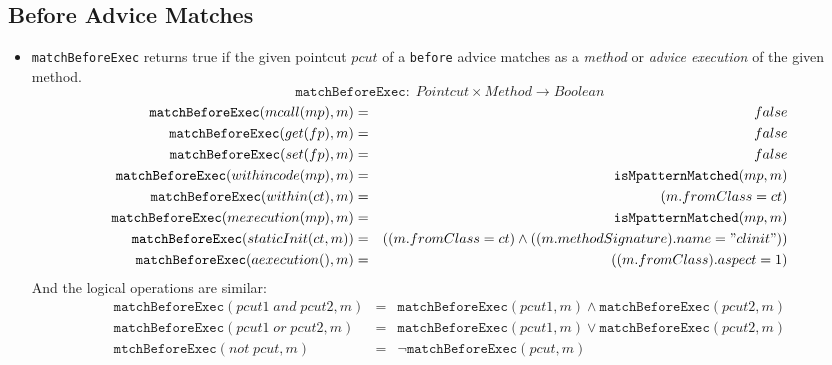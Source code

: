 \subsection{Before Advice Matches}
\begin{itemize}
  \item
  \texttt{matchBeforeExec} returns true if the given pointcut $pcut$ of a \texttt{before} advice matches as a \textsl{method} or \textsl{advice execution} of the given method.
$$\texttt{matchBeforeExec}:\;Pointcut\times Method\rightarrow Boolean$$
\begin{eqnarray*}
  \texttt{matchBeforeExec}(mcall(mp),m)&=&false\\
  \texttt{matchBeforeExec}(get(fp),m)&=&false\\
  \texttt{matchBeforeExec}(set(fp),m)&=&false\\
  \texttt{matchBeforeExec}(withincode(mp),m)&=&\texttt{isMpatternMatched}(mp,m)\\
  \texttt{matchBeforeExec}(within(ct),m)&=&(m.fromClass=ct)\\
  \texttt{matchBeforeExec}(mexecution(mp),m)&=&\texttt{isMpatternMatched}(mp,m)\\
  \texttt{matchBeforeExec}(staticInit(ct,m))&=&((m.fromClass=ct)\wedge ((m.methodSignature).name="clinit"))\\
  \texttt{matchBeforeExec}(aexecution(),m)&=&((m.fromClass).aspect=1)\\
\end{eqnarray*}
And the logical operations are similar:
\begin{eqnarray*}
    \texttt{matchBeforeExec}(pcut1\; and\; pcut2,m)&=&\texttt{matchBeforeExec}(pcut1,m)\wedge \texttt{matchBeforeExec}(pcut2,m)\\
  \texttt{matchBeforeExec}(pcut1\; or\; pcut2,m)&=&\texttt{matchBeforeExec}(pcut1,m)\vee \texttt{matchBeforeExec}(pcut2,m)\\
  \texttt{mtchBeforeExec}(not\; pcut,m)&=&\neg \texttt{matchBeforeExec}(pcut,m)\\
\end{eqnarray*}


\end{itemize}
